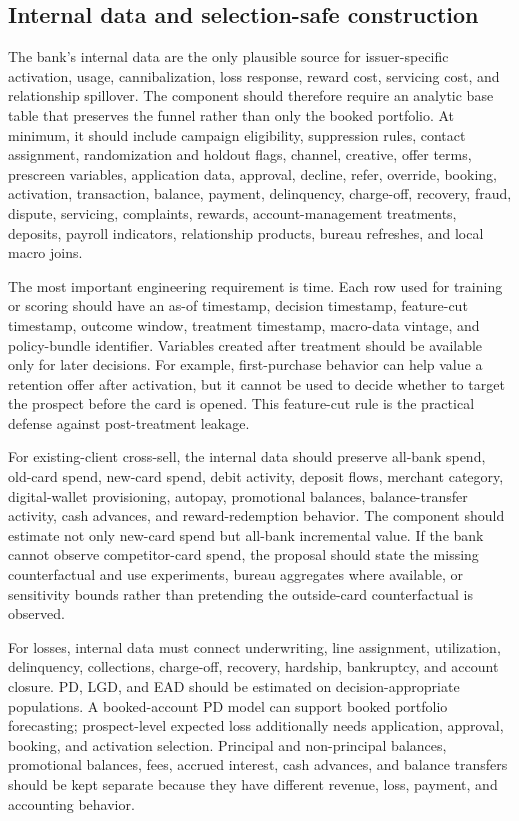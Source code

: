\documentclass[11pt]{article}
\newcommand{\1}{\mathbf{1}}
\begin{document}
\subsection{Internal data and selection-safe construction}

The bank's internal data are the only plausible source for issuer-specific
activation, usage, cannibalization, loss response, reward cost, servicing cost,
and relationship spillover. The component should therefore require an analytic
base table that preserves the funnel rather than only the booked portfolio. At
minimum, it should include campaign eligibility, suppression rules, contact
assignment, randomization and holdout flags, channel, creative, offer terms,
prescreen variables, application data, approval, decline, refer, override,
booking, activation, transaction, balance, payment, delinquency, charge-off,
recovery, fraud, dispute, servicing, complaints, rewards, account-management
treatments, deposits, payroll indicators, relationship products, bureau
refreshes, and local macro joins.

The most important engineering requirement is time. Each row used for
training or scoring should have an as-of timestamp, decision timestamp,
feature-cut timestamp, outcome window, treatment timestamp, macro-data vintage,
and policy-bundle identifier. Variables created after treatment should be
available only for later decisions. For example, first-purchase behavior can
help value a retention offer after activation, but it cannot be used to decide
whether to target the prospect before the card is opened. This feature-cut rule
is the practical defense against post-treatment leakage.

For existing-client cross-sell, the internal data should preserve all-bank
spend, old-card spend, new-card spend, debit activity, deposit flows, merchant
category, digital-wallet provisioning, autopay, promotional balances,
balance-transfer activity, cash advances, and reward-redemption behavior. The
component should estimate not only new-card spend but all-bank incremental
value. If the bank cannot observe competitor-card spend, the proposal should
state the missing counterfactual and use experiments, bureau aggregates where
available, or sensitivity bounds rather than pretending the outside-card
counterfactual is observed.

For losses, internal data must connect underwriting, line assignment,
utilization, delinquency, collections, charge-off, recovery, hardship,
bankruptcy, and account closure. PD, LGD, and EAD should be estimated on
decision-appropriate populations. A booked-account PD model can support booked
portfolio forecasting; prospect-level expected loss additionally needs
application, approval, booking, and activation selection. Principal and
non-principal balances, promotional balances, fees, accrued interest, cash
advances, and balance transfers should be kept separate because they have
different revenue, loss, payment, and accounting behavior.
\end{document}
